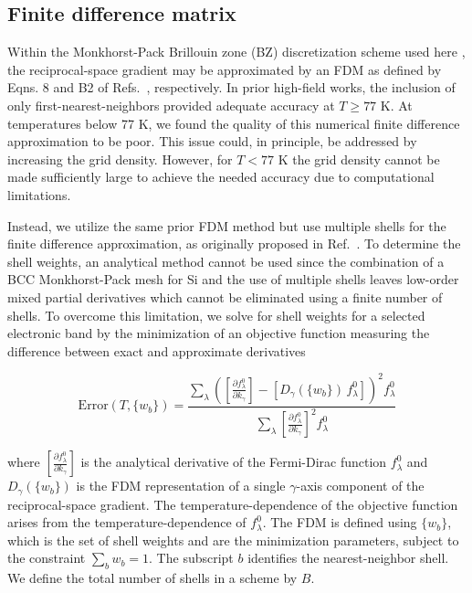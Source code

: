 \documentclass[aps,prx,preprint,letterpaper,groupedaddress,longbibliography]{revtex4-2}
\theoremstyle{definition}
\begin{document}
\subsection{Finite difference matrix}
Within the Monkhorst-Pack  Brillouin zone (BZ) discretization scheme used here \cite{Monkhorst:1976}, the reciprocal-space gradient may be approximated by an FDM as defined by Eqns. 8 and B2 of Refs.~\cite{Wannier90,Marzari:1997}, respectively. In prior high-field works, \cite{Choi:2021,Cheng:2022,Catherall:2022,Ben:2022} the inclusion of only first-nearest-neighbors provided adequate accuracy at $T\geq 77$ K. At temperatures below 77 K, we found the quality of this numerical finite difference approximation to be poor. This issue could, in principle, be addressed by increasing the grid density. However, for $T<77$ K the grid density cannot be made sufficiently large to achieve the needed accuracy due to computational limitations.\par

Instead, we utilize the same prior FDM method but use multiple shells for the finite difference approximation, as originally proposed in Ref.~\cite{Marzari:1997}. To determine the shell weights, an analytical method cannot be used since the combination of a BCC Monkhorst-Pack mesh for Si and the use of multiple shells leaves low-order mixed partial derivatives which cannot be eliminated using a finite number of shells. To overcome this limitation, we solve for shell weights for a selected electronic band by the minimization of an objective function measuring the difference between exact and approximate derivatives

\begin{equation}
    \mathrm{Error}(T,\{w_b\})
    =
    \frac
        {\sum_\lambda \left( \left[\frac{\partial f^0_\lambda}{\partial k_\gamma}\right] - [D_\gamma(\{w_b\})\,f^0_\lambda]\right)^2 f^0_{\lambda}}
        {\sum_\lambda \left[\frac{\partial f^0_{\lambda}}{\partial k_\gamma}\right]^2 f^0_\lambda}
    \label{obj_eqn}
\end{equation}

\noindent where $\left[\frac{\partial f^0_{\lambda}}{\partial k_\gamma}\right]$ is the analytical derivative of the Fermi-Dirac function $f^0_{\lambda}$ and $D_\gamma(\{w_b\})$ is the FDM representation of a single $\gamma$-axis component of the reciprocal-space gradient. The temperature-dependence of the objective function arises from the temperature-dependence of $f^0_{\lambda}$.  The FDM is defined using $\{w_b\}$, which is the set of shell weights and are the minimization parameters, subject to the constraint $\sum_b w_b = 1$. The subscript $b$ identifies the nearest-neighbor shell. We define the total number of shells in a scheme by $B$.\par
\end{document}
